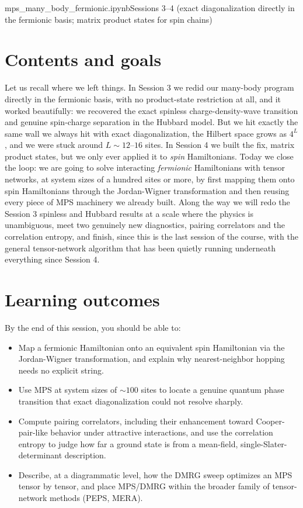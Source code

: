 \documentclass[all_sessions.tex]{subfiles}
\begin{document}
%
  {mps\_many\_body\_fermionic.ipynb}{Sessions 3--4 (exact diagonalization directly in the fermionic
  basis; matrix product states for spin chains)}

\section*{Contents and goals}
Let us recall where we left things. In Session 3 we redid our many-body program directly in the
fermionic basis, with no product-state restriction at all, and it worked beautifully: we recovered
the exact spinless charge-density-wave transition and genuine spin-charge separation in the Hubbard
model. But we hit exactly the same wall we always hit with exact diagonalization, the Hilbert space
grows as $4^L$, and we were stuck around $L\sim 12$--$16$ sites. In Session 4 we built the fix,
matrix product states, but we only ever applied it to \emph{spin} Hamiltonians. Today we close the
loop: we are going to solve interacting \emph{fermionic} Hamiltonians with tensor networks, at
system sizes of a hundred sites or more, by first mapping them onto spin Hamiltonians through the
Jordan-Wigner transformation and then reusing every piece of MPS machinery we already built. Along
the way we will redo the Session 3 spinless and Hubbard results at a scale where the physics is
unambiguous, meet two genuinely new diagnostics, pairing correlators and the correlation entropy,
and finish, since this is the last session of the course, with the general tensor-network algorithm
that has been quietly running underneath everything since Session 4.

\section*{Learning outcomes}
By the end of this session, you should be able to:
\begin{itemize}[nosep]
  \item Map a fermionic Hamiltonian onto an equivalent spin Hamiltonian via the Jordan-Wigner
    transformation, and explain why nearest-neighbor hopping needs no explicit string.
  \item Use MPS at system sizes of $\sim100$ sites to locate a genuine quantum phase transition
    that exact diagonalization could not resolve sharply.
  \item Compute pairing correlators, including their enhancement toward Cooper-pair-like behavior
    under attractive interactions, and use the correlation entropy to judge how far a ground state
    is from a mean-field, single-Slater-determinant description.
  \item Describe, at a diagrammatic level, how the DMRG sweep optimizes an MPS tensor by tensor,
    and place MPS/DMRG within the broader family of tensor-network methods (PEPS, MERA).
\end{itemize}
\end{document}
